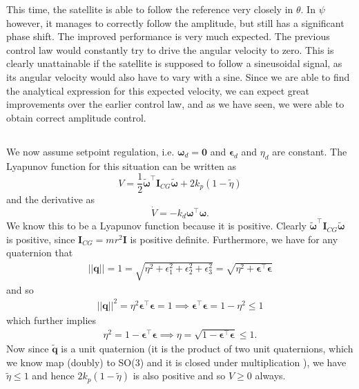 This time, the satellite is able to follow the reference very closely in $\theta$. In $\psi$ however, it manages to correctly follow the amplitude, but still has a significant phase shift. The improved performance is very much expected. The previous control law would constantly try to drive the angular velocity to zero. This is clearly unattainable if the satellite is supposed to follow a sineusoidal signal, as its angular velocity would also have to vary with a sine. Since we are able to find the analytical expression for this expected velocity, we can expect great improvements over the earlier control law, and as we have seen, we were able to obtain correct amplitude control.

\subsection{}
We now assume setpoint regulation, i.e. $\boldsymbol{\omega}_d = \mathbf{0}$ and $\boldsymbol{\epsilon}_d$ and $\eta_d$ are constant. The Lyapunov function for this situation can be written as
 \begin{equation}
	 V = \frac{1}{2} \tilde{\boldsymbol{\omega}}^{\top} \mathbf{I}_{CG}\tilde{\boldsymbol{\omega}} + 2 k_p (1-\tilde{\eta})
 \end{equation}
and the derivative as
\begin{equation}
	\dot{V} = -k_d \boldsymbol{\omega}^{\top} \boldsymbol{\omega}.
\end{equation}
We know this to be a Lyapunov function because it is positive. Clearly $\tilde{\boldsymbol{\omega}}^\top\mathbf{I}_{CG}\boldsymbol{\tilde \omega}$ is positive, since $\mathbf{I}_{CG} = mr^2\mathbf{I}$ is positive definite. Furthermore, we have for any quaternion that
\begin{equation}\begin{aligned}
||\mathbf{q}|| = 1 = \sqrt{\eta^2 + \epsilon_1^2 + \epsilon_2^2 + \epsilon_3^2}
= \sqrt{\eta^2 + \boldsymbol{\epsilon}^\top \boldsymbol{\epsilon}}
\end{aligned}\end{equation}
and so
\begin{equation}\begin{aligned}
||\mathbf{q}||^2 = \eta^2 \boldsymbol{\epsilon}^\top\boldsymbol{\epsilon} = 1
\implies \boldsymbol{\epsilon}^\top \boldsymbol{\epsilon} = 1 - \eta^2 \leq 1
\end{aligned}\end{equation}
which further implies
\begin{equation}\begin{aligned}
\eta^2 = 1 - \boldsymbol{\epsilon}^\top \boldsymbol{\epsilon}
\implies \eta = \sqrt{1 - \boldsymbol{\epsilon}^\top \boldsymbol{\epsilon}} \leq 1.
\end{aligned}\end{equation}
Now since $\tilde{\mathbf{q}}$ is a unit quaternion (it is the product of two unit quaternions, which we know map (doubly) to SO(3) and it is closed under multiplication \cite{Sola}), we have $\tilde \eta \leq 1$ and hence $2k_p(1-\tilde \eta)$ is also positive and so $V \geq 0$ always.
